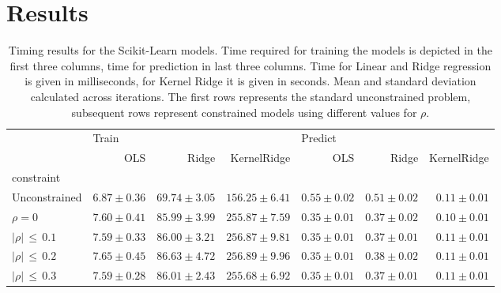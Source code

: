 \documentclass[utf8]{frontiersSCNS} %
\begin{document}
\section{Results}

\begin{table}[]
\begin{tabular}{lrrrrrr}
\toprule
 & \multicolumn{3}{l}{Train} & \multicolumn{3}{l}{Predict} \\
 &   OLS & Ridge & KernelRidge &     OLS & Ridge & KernelRidge \\
constraint         &       &       &             &         &       &             \\
\midrule
Unconstrained      &  $6.87\pm 0.36$& $69.74\pm 3.05$&      $156.25\pm 6.41$ &    $0.55\pm 0.02$&  $0.51\pm 0.02$ & $0.11\pm 0.01$\\
$\rho=0$             &  $7.60\pm 0.41$& $85.99\pm 3.99$& $255.87\pm 7.59$& $0.35\pm 0.01$& $0.37\pm 0.02$& $0.10\pm 0.01$\\
$|\rho|\, \le\, 0.1$ &  $7.59\pm 0.33$& $86.00\pm 3.21$& $256.87\pm 9.81$& $0.35\pm 0.01$& $0.37\pm 0.01$& $0.11\pm 0.01$\\
$|\rho|\, \le\, 0.2$ &  $7.65\pm 0.45$& $86.63\pm 4.72$& $256.89\pm 9.96$& $0.35\pm 0.01$& $0.38\pm 0.02$& $0.11\pm 0.01$\\
$|\rho|\, \le\, 0.3$ &  $7.59\pm 0.28$& $86.01\pm 2.43$& $255.68\pm 6.92$& $0.35\pm 0.01$& $0.37\pm 0.01$& $0.11\pm 0.01$\\
\bottomrule
\end{tabular}
\caption{Timing results for the Scikit-Learn models. Time required for training the models is depicted in the first three columns, time for prediction in last three columns. Time for Linear and Ridge regression is given in milliseconds, for Kernel Ridge it is given in seconds. Mean and standard deviation calculated across iterations. The first rows represents the standard unconstrained problem, subsequent rows represent constrained models using different values for $\rho$.}
\label{tab:timing}
\end{table}
\end{document}
